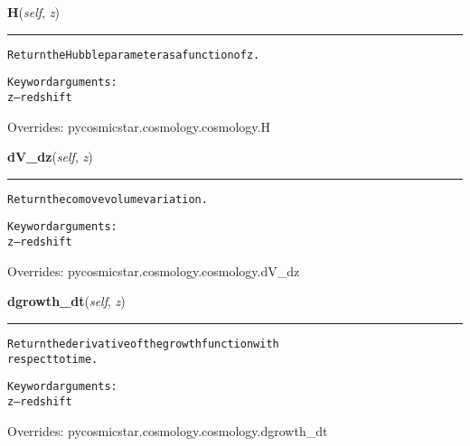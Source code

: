     \vspace{0.5ex}

\hspace{.8\funcindent}\begin{boxedminipage}{\funcwidth}

    \raggedright \textbf{H}(\textit{self}, \textit{z})

    \vspace{-1.5ex}

    \rule{\textwidth}{0.5\fboxrule}
\setlength{\parskip}{2ex}
\begin{alltt}
Return the Hubble parameter as a function of z.

Keyword arguments:
    z -- redshift
\end{alltt}

\setlength{\parskip}{1ex}
      Overrides: pycosmicstar.cosmology.cosmology.H

    \end{boxedminipage}

    \vspace{0.5ex}

\hspace{.8\funcindent}\begin{boxedminipage}{\funcwidth}

    \raggedright \textbf{dV\_dz}(\textit{self}, \textit{z})

    \vspace{-1.5ex}

    \rule{\textwidth}{0.5\fboxrule}
\setlength{\parskip}{2ex}
\begin{alltt}
Return the comove volume variation.

Keyword arguments:
    z -- redshift
\end{alltt}

\setlength{\parskip}{1ex}
      Overrides: pycosmicstar.cosmology.cosmology.dV\_dz

    \end{boxedminipage}

    \vspace{0.5ex}

\hspace{.8\funcindent}\begin{boxedminipage}{\funcwidth}

    \raggedright \textbf{dgrowth\_dt}(\textit{self}, \textit{z})

    \vspace{-1.5ex}

    \rule{\textwidth}{0.5\fboxrule}
\setlength{\parskip}{2ex}
\begin{alltt}
Return the derivative of the growth function with
respect to  time.

Keyword arguments:
    z -- redshift
\end{alltt}

\setlength{\parskip}{1ex}
      Overrides: pycosmicstar.cosmology.cosmology.dgrowth\_dt

    \end{boxedminipage}

